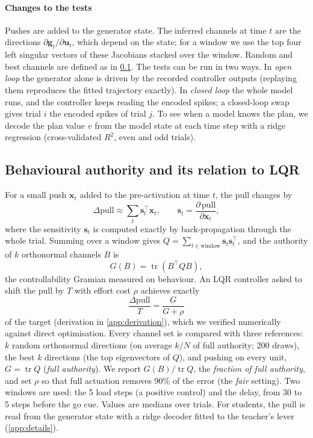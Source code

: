 \documentclass[11pt,a4paper]{article}
\newcommand{\vect}[1]{\bm{#1}}
\newcommand{\tr}{\operatorname{tr}}
\newcommand{\pull}{\mathrm{pull}}
\begin{document}
\paragraph{Changes to the tests} Pushes are added to the generator state. The inferred channels at time $t$ are the directions $\partial\vect g_t/\partial\vect u_t$, which depend on the state; for a window we use the top four left singular vectors of these Jacobians stacked over the window. Random and best channels are defined as in \cref{sec:authority}. The tests can be run in two ways. In \emph{open loop} the generator alone is driven by the recorded controller outputs (replaying them reproduces the fitted trajectory exactly). In \emph{closed loop} the whole model runs, and the controller keeps reading the encoded spikes; a closed-loop swap gives trial $i$ the encoded spikes of trial $j$. To see when a model knows the plan, we decode the plan value $v$ from the model state at each time step with a ridge regression (cross-validated $R^2$, even and odd trials).

\subsection{Behavioural authority and its relation to LQR}\label{sec:authority}

For a small push $\vect x_t$ added to the pre-activation at time $t$, the pull changes by
\begin{equation}
  \Delta \pull \approx \sum_t \vect s_t^\top \vect x_t, \qquad \vect s_t = \frac{\partial\, \pull}{\partial \vect x_t},
\end{equation}
where the sensitivity $\vect s_t$ is computed exactly by back-propagation through the whole trial. Summing over a window gives $Q = \sum_{t\in\text{window}} \vect s_t \vect s_t^\top$, and the authority of $k$ orthonormal channels $B$ is
\begin{equation}
  G(B) = \tr\!\left(B^\top Q B\right),
\end{equation}
the controllability Gramian measured on behaviour. An LQR controller asked to shift the pull by $T$ with effort cost $\rho$ achieves exactly
\begin{equation}
  \frac{\Delta \pull}{T} = \frac{G}{G+\rho}
  \label{eq:lqr}
\end{equation}
of the target (derivation in \cref{app:derivation}), which we verified numerically against direct optimisation. Every channel set is compared with three references: $k$ random orthonormal directions (on average $k/N$ of full authority; 200 draws), the best $k$ directions (the top eigenvectors of $Q$), and pushing on every unit, $G=\tr Q$ (\emph{full authority}). We report $G(B)/\tr Q$, the \emph{fraction of full authority}, and set $\rho$ so that full actuation removes 90\% of the error (the \emph{fair} setting). Two windows are used: the 5 load steps (a positive control) and the delay, from 30 to 5 steps before the go cue. Values are medians over trials. For students, the pull is read from the generator state with a ridge decoder fitted to the teacher's lever (\cref{app:details}).
\end{document}
